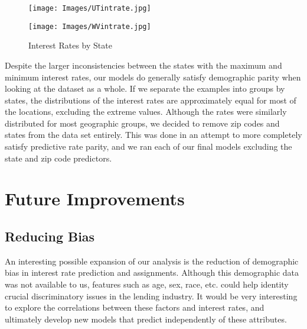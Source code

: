 \documentclass[twocolumn]{article}
\begin{document}
\begin{figure}[h]
\centering
\texttt{[image: Images/UTintrate.jpg]}
\end{figure}

\begin{figure}[h]
\centering
\texttt{[image: Images/WVintrate.jpg]}
\caption{Interest Rates by State}
\end{figure}


\par{Despite the larger inconsistencies between the states with the maximum and minimum interest rates, our models do generally satisfy demographic parity when looking at the dataset as a whole. If we separate the examples into groups by states, the distributions of the interest rates are approximately equal for most of the locations, excluding the extreme values. Although the rates were similarly distributed for most geographic groups, we decided to remove zip codes and states from the data set entirely. This was done in an attempt to more completely satisfy predictive rate parity,  and we ran each of our final models excluding the state and zip code predictors. 
}


\section{Future Improvements}

\subsection{Reducing Bias}
\par{\hspace{18}An interesting possible expansion of our analysis is the reduction of demographic bias in interest rate prediction and assignments. Although this demographic data was not available to us, features such as age, sex, race, etc. could help identity crucial discriminatory issues in the lending industry. It would be very interesting to explore the correlations between these factors and interest rates, and ultimately develop new models that predict independently of these attributes. 
}
\end{document}
